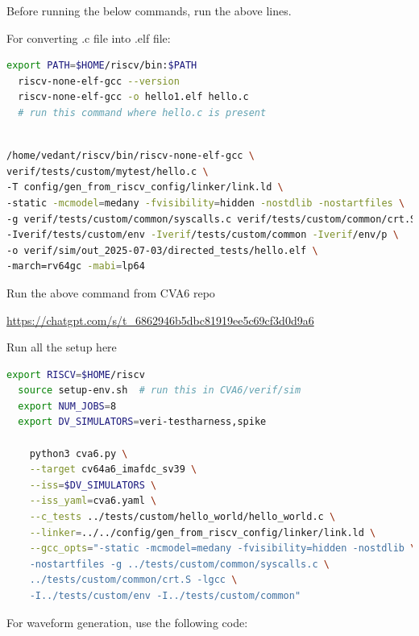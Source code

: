 \documentclass[12pt, a4paper]{article}
\begin{document}
Before running the below commands, run the above lines.



 
For converting .c file into .elf file:
\begin{lstlisting}[language=bash, frame=single, basicstyle=\ttfamily\footnotesize, numbers = none]
  export PATH=$HOME/riscv/bin:$PATH
  riscv-none-elf-gcc --version
  riscv-none-elf-gcc -o hello1.elf hello.c 
  # run this command where hello.c is present
 \end{lstlisting}

\begin{lstlisting}[language=bash, frame=single, basicstyle=\ttfamily\footnotesize, numbers = none]

/home/vedant/riscv/bin/riscv-none-elf-gcc \
verif/tests/custom/mytest/hello.c \
-T config/gen_from_riscv_config/linker/link.ld \
-static -mcmodel=medany -fvisibility=hidden -nostdlib -nostartfiles \
-g verif/tests/custom/common/syscalls.c verif/tests/custom/common/crt.S -lgcc \
-Iverif/tests/custom/env -Iverif/tests/custom/common -Iverif/env/p \
-o verif/sim/out_2025-07-03/directed_tests/hello.elf \
-march=rv64gc -mabi=lp64
 \end{lstlisting}

 Run the above command from CVA6 repo
 
 \url{https://chatgpt.com/s/t_6862946b5dbc81919ee5c69cf3d0d9a6}


Run all the setup here
\begin{lstlisting}[language=bash, frame=single, basicstyle=\ttfamily\footnotesize, numbers = none]
  export RISCV=$HOME/riscv
  source setup-env.sh  # run this in CVA6/verif/sim
  export NUM_JOBS=8
  export DV_SIMULATORS=veri-testharness,spike
  
    python3 cva6.py \
    --target cv64a6_imafdc_sv39 \
    --iss=$DV_SIMULATORS \
    --iss_yaml=cva6.yaml \
    --c_tests ../tests/custom/hello_world/hello_world.c \
    --linker=../../config/gen_from_riscv_config/linker/link.ld \
    --gcc_opts="-static -mcmodel=medany -fvisibility=hidden -nostdlib \
    -nostartfiles -g ../tests/custom/common/syscalls.c \
    ../tests/custom/common/crt.S -lgcc \
    -I../tests/custom/env -I../tests/custom/common"

 \end{lstlisting}


For waveform generation, use the following code:
\end{document}
